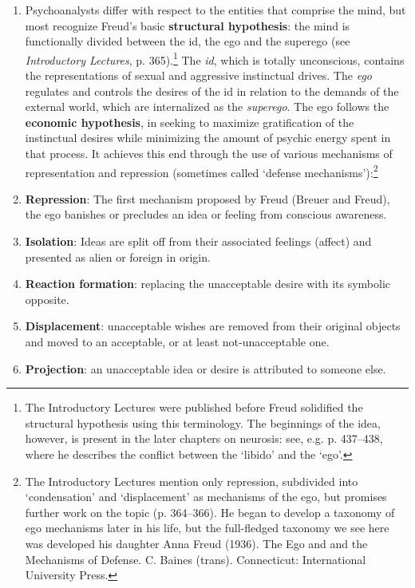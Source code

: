 \begin{refsection}
\begin{enumerate}
\item Psychoanalysts differ with respect to the entities that comprise the mind, but most recognize Freud's basic \textbf{structural hypothesis}: the mind is functionally divided between the id, the ego and the superego (see \emph{Introductory Lectures}, p. 365).\footnote{The Introductory Lectures were published before Freud solidified the structural hypothesis using this terminology. The beginnings of the idea, however, is present in the later chapters on neurosis: see, e.g. p. 437--438, where he describes the conflict between the `libido' and the `ego'.} The \emph{id}, which is totally unconscious, contains the representations of sexual and aggressive instinctual drives. The \emph{ego} regulates and controls the desires of the id in relation to the demands of the external world, which are internalized as the \emph{superego}. The ego follows the \textbf{economic hypothesis}, in seeking to maximize gratification of the instinctual desires while minimizing the amount of psychic energy spent in that process. It achieves this end through the use of various mechanisms of representation and repression (sometimes called `defense mechanisms'):\footnote{The Introductory Lectures mention only repression, subdivided into `condensation' and `displacement' as mechanisms of the ego, but promises further work on the topic (p. 364--366). He began to develop a taxonomy of ego mechanisms later in his life, but the full-fledged taxonomy we see here was developed his daughter Anna Freud (1936). The Ego and and the Mechanisms of Defense. C. Baines (trans). Connecticut: International University Press.}

\item \textbf{Repression}: The first mechanism proposed by Freud (Breuer and Freud), the ego banishes or precludes an idea or feeling from conscious awareness.

\item \textbf{Isolation}: Ideas are split off from their associated feelings (affect) and presented as alien or foreign in origin.

\item \textbf{Reaction formation}: replacing the unacceptable desire with its symbolic opposite.

\item \textbf{Displacement}: unacceptable wishes are removed from their original objects and moved to an acceptable, or at least not-unacceptable one.

\item \textbf{Projection}: an unacceptable idea or desire is attributed to someone else.


\end{enumerate}
\end{refsection}
